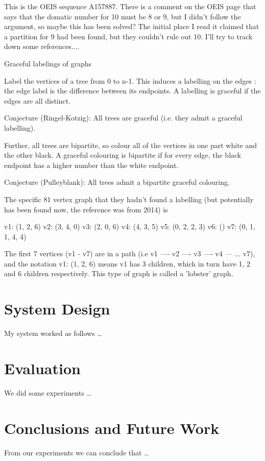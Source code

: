 \documentclass[a4paper, 11pt]{article}
\begin{document}
This is the OEIS sequence A157887.  
There is a comment on the OEIS page that says that the domatic number for 10 must be 8 or 9, but I didn't follow the argument, so maybe this has been solved? The initial place I read it claimed that a partition for 9 had been found, but they couldn't rule out 10.  I'll try to track down some references....
 
 
Graceful labelings of graphs
 
Label the vertices of a tree from 0 to n-1.   This induces a labelling on the edges : the edge label is the difference between its endpoints.
A labelling is graceful if the edges are all distinct.
 
Conjecture (Ringel-Kotzig): All trees are graceful (i.e. they admit a graceful labelling).
 
Further, all trees are bipartite, so colour all of the vertices in one part white and the other black.  A graceful colouring is bipartite if for every edge, the black endpoint has a higher number than the white endpoint.
 
Conjecture (Pulleyblank):  All trees admit a bipartite graceful colouring.
 
The specific 81 vertex graph that they hadn't found a labelling (but potentially has been found now, the reference was from 2014) is
 
v1: (1, 2, 6)
v2: (3, 4, 0)
v3: (2, 0, 6)
v4: (4, 3, 5)
v5: (0, 2, 2, 3)
v6: ()
v7: (0, 1, 1, 4, 4)
 
 
The first 7 vertices (v1 - v7) are in a path (i.e  v1 ---- v2 ---- v3 ---- v4 --- ...  v7), and the notation v1: (1, 2, 6) means v1 has 3 children, which in turn have 1, 2 and 6 children respectively.  This type of graph is called a 'lobster' graph.

\pagebreak

\section{System Design}

My system worked as follows \ldots

\pagebreak

\section{Evaluation}

We did some experiments \ldots

\pagebreak

\section{Conclusions and Future Work}

From our experiments we can conclude that \ldots


\end{document}
